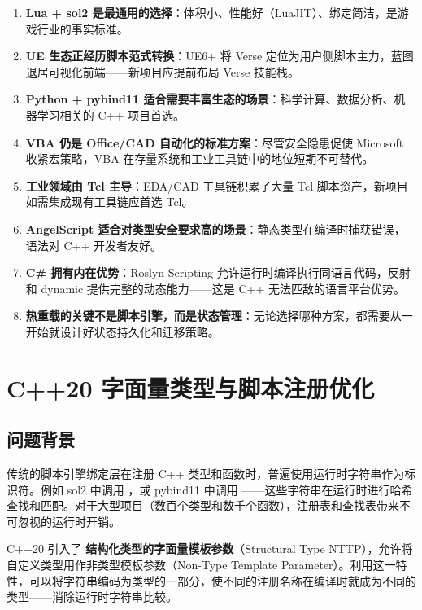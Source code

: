 \documentclass[12pt,a4paper,fontset=fandol]{ctexbook}
\begin{document}
\begin{enumerate}
  \item \textbf{Lua + sol2 是最通用的选择}：体积小、性能好（LuaJIT）、绑定简洁，是游戏行业的事实标准。
  \item \textbf{UE 生态正经历脚本范式转换}：UE6+ 将 Verse 定位为用户侧脚本主力，蓝图退居可视化前端——新项目应提前布局 Verse 技能栈。
  \item \textbf{Python + pybind11 适合需要丰富生态的场景}：科学计算、数据分析、机器学习相关的 C++ 项目首选。
  \item \textbf{VBA 仍是 Office/CAD 自动化的标准方案}：尽管安全隐患促使 Microsoft 收紧宏策略，VBA 在存量系统和工业工具链中的地位短期不可替代。
  \item \textbf{工业领域由 Tcl 主导}：EDA/CAD 工具链积累了大量 Tcl 脚本资产，新项目如需集成现有工具链应首选 Tcl。
  \item \textbf{AngelScript 适合对类型安全要求高的场景}：静态类型在编译时捕获错误，语法对 C++ 开发者友好。
  \item \textbf{C\# 拥有内在优势}：Roslyn Scripting 允许运行时编译执行同语言代码，反射和 dynamic 提供完整的动态能力——这是 C++ 无法匹敌的语言平台优势。
  \item \textbf{热重载的关键不是脚本引擎，而是状态管理}：无论选择哪种方案，都需要从一开始就设计好状态持久化和迁移策略。
\end{enumerate}


\appendix

\chapter{C++20 字面量类型与脚本注册优化}\label{app:literal-type}

\section{问题背景}\label{sec:lt-problem}

传统的脚本引擎绑定层在注册 C++ 类型和函数时，普遍使用运行时字符串作为标识符。例如 sol2 中调用 ，或 pybind11 中调用 ——这些字符串在运行时进行哈希查找和匹配。对于大型项目（数百个类型和数千个函数），注册表和查找表带来不可忽视的运行时开销。

C++20 引入了 \textbf{结构化类型的字面量模板参数}（Structural Type NTTP），允许将自定义类型用作非类型模板参数（Non-Type Template Parameter）。利用这一特性，可以将字符串编码为类型的一部分，使不同的注册名称在编译时就成为不同的类型——消除运行时字符串比较。
\end{document}
